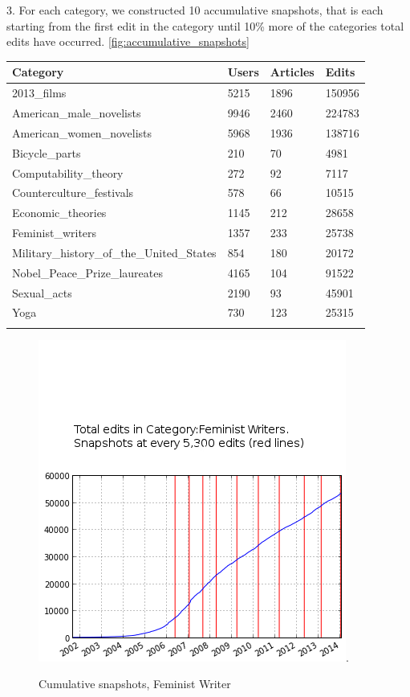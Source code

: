 \documentclass{acm_proc_article-sp}
\begin{document}
3. For each category, we constructed 10 accumulative snapshots, that is each starting from the first edit in the category until 10\% more of the categories total edits have occurred. \ref{fig:accumulative_snapshots}

\begin{tabular}{llll}
\toprule
Category & Users & Articles &  Edits \\
\midrule
2013\_films &  5215 &     1896 &  150956 \\
American\_male\_novelists &  9946 &     2460 &  224783 \\
American\_women\_novelists &  5968 &     1936 &  138716 \\
Bicycle\_parts &   210 &       70 &    4981 \\
Computability\_theory &   272 &       92 &    7117 \\
Counterculture\_festivals &   578 &       66 &   10515 \\
Economic\_theories &  1145 &      212 &   28658 \\
Feminist\_writers &  1357 &      233 &   25738 \\
Military\_history\_of\_the\_United\_States &   854 &      180 &   20172 \\
Nobel\_Peace\_Prize\_laureates &  4165 &      104 &   91522 \\
Sexual\_acts &  2190 &       93 &   45901 \\
Yoga &   730 &      123 &   25315 \\
\bottomrule
\label{tab:statistics}
\end{tabular}

\begin{figure}[!t]
\centering
\includegraphics[width=0.9\columnwidth]{accumulative snapshot points for Feminist Writers.png}.
\caption{Cumulative snapshots, Feminist Writer}
\label{fig:cumsnaps}
\end{figure}
\end{document}
